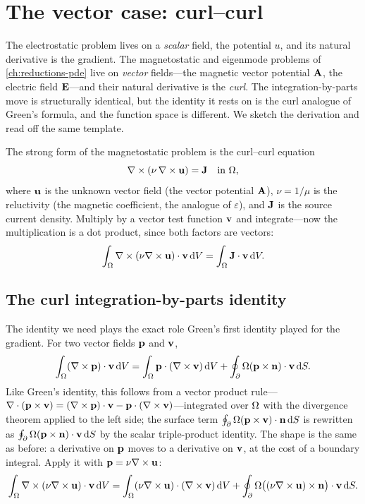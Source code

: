 \section{The vector case: curl--curl}
\label{sec:curlcurl}

The electrostatic problem lives on a \emph{scalar} field, the potential $u$, and
its natural derivative is the gradient. The magnetostatic and eigenmode problems
of \cref{ch:reductions-pde} live on \emph{vector} fields---the magnetic vector
potential $\mathbf{A}$, the electric field $\mathbf{E}$---and their natural derivative is the
\emph{curl}. The integration-by-parts move is structurally identical, but the
identity it rests on is the curl analogue of Green's formula, and the function
space is different. We sketch the derivation and read off the same template.

The strong form of the magnetostatic problem is the curl--curl equation
\begin{equation}
  \nabla\times(\nu\,\nabla\times\mathbf{u}) = \mathbf{J} \quad\text{in }\Omega,
  \label{eq:curlcurl-strong}
\end{equation}
where $\mathbf{u}$ is the unknown vector field (the vector potential $\mathbf{A}$), $\nu=1/\mu$
is the reluctivity (the magnetic coefficient, the analogue of $\varepsilon$), and
$\mathbf{J}$ is the source current density. Multiply by a vector test function $\mathbf{v}$ and
integrate---now the multiplication is a dot product, since both factors are
vectors:
\begin{equation}
  \int_\Omega \nabla\times(\nu\nabla\times\mathbf{u})\cdot\mathbf{v}\,\mathrm{d}V = \int_\Omega \mathbf{J}\cdot\mathbf{v}\,\mathrm{d}V.
  \label{eq:curlcurl-weighted}
\end{equation}

\subsection{The curl integration-by-parts identity}

The identity we need plays the exact role Green's first identity played for the
gradient. For two vector fields $\mathbf{p}$ and $\mathbf{v}$,
\begin{equation}
  \int_\Omega (\nabla\times\mathbf{p})\cdot\mathbf{v}\,\mathrm{d}V
  = \int_\Omega \mathbf{p}\cdot(\nabla\times\mathbf{v})\,\mathrm{d}V
  + \oint_\partial\Omega (\mathbf{p}\times\mathbf{n})\cdot\mathbf{v}\,\mathrm{d}S.
  \label{eq:curlibp}
\end{equation}
Like Green's identity, this follows from a vector product rule---$\nabla\cdot(\mathbf{p}\times
\mathbf{v}) = (\nabla\times\mathbf{p})\cdot\mathbf{v} - \mathbf{p}\cdot(\nabla\times\mathbf{v})$---integrated over $\Omega$ with the
divergence theorem applied to the left side; the surface term
$\oint_\partial\Omega(\mathbf{p}\times\mathbf{v})\cdot\mathbf{n}\,\mathrm{d}S$ is rewritten as
$\oint_\partial\Omega(\mathbf{p}\times\mathbf{n})\cdot\mathbf{v}\,\mathrm{d}S$ by the scalar triple-product
identity. The shape is the same as before: a derivative on $\mathbf{p}$ moves to a
derivative on $\mathbf{v}$, at the cost of a boundary integral. Apply it with
$\mathbf{p} = \nu\nabla\times\mathbf{u}$:
\[
  \int_\Omega \nabla\times(\nu\nabla\times\mathbf{u})\cdot\mathbf{v}\,\mathrm{d}V
  = \int_\Omega (\nu\nabla\times\mathbf{u})\cdot(\nabla\times\mathbf{v})\,\mathrm{d}V
  + \oint_\partial\Omega \bigl((\nu\nabla\times\mathbf{u})\times\mathbf{n}\bigr)\cdot\mathbf{v}\,\mathrm{d}S.
\]

